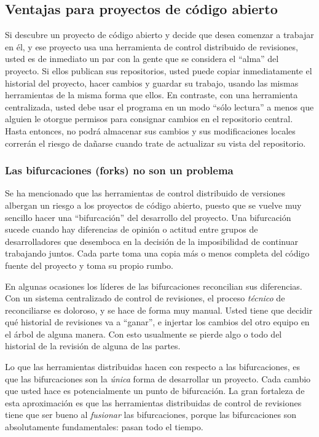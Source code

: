 \subsection{Ventajas para proyectos de código abierto}

Si descubre un proyecto de código abierto y decide que desea comenzar
a trabajar en él, y ese proyecto usa una herramienta de control
distribuido de revisiones, usted es de inmediato un par con la gente que se
considera el ``alma'' del proyecto.  Si ellos publican sus
repositorios, usted puede copiar inmediatamente el historial del proyecto,
hacer cambios y guardar su trabajo, usando las mismas herramientas de
la misma forma que ellos. En contraste, con una herramienta
centralizada, usted debe usar el programa en un modo ``sólo lectura'' a
menos que alguien le otorgue permisos para consignar cambios en el
repositorio central. Hasta entonces, no podrá almacenar sus cambios y
sus modificaciones locales correrán el riesgo de dañarse cuando trate
de actualizar su vista del repositorio.

\subsubsection{Las bifurcaciones (forks) no son un problema}

Se ha mencionado que las herramientas de control distribuido de
versiones albergan un riesgo a los proyectos de código abierto, puesto
que se vuelve muy sencillo hacer una ``bifurcación'' del
desarrollo del proyecto.  Una bifurcación sucede cuando hay diferencias
de opinión o actitud entre grupos de desarrolladores que desemboca en
la decisión de la imposibilidad de continuar trabajando juntos. Cada
parte toma una copia más o menos completa del código fuente del
proyecto y toma su propio rumbo.

En algunas ocasiones los líderes de las bifurcaciones reconcilian sus
diferencias. Con un sistema centralizado de control de revisiones, el
proceso \emph{técnico} de reconciliarse es doloroso, y se hace de
forma muy manual.  Usted tiene que decidir qué historial de revisiones va a
``ganar'', e injertar los cambios del otro equipo en el árbol de alguna
manera. Con esto usualmente se pierde algo o todo del historial de la
revisión de alguna de las partes.

Lo que las herramientas distribuidas hacen con respecto a las
bifurcaciones, es que las bifurcaciones son la \emph{única} forma de
desarrollar un proyecto. Cada cambio que usted hace es potencialmente
un punto de bifurcación. La gran fortaleza de esta aproximación es que
las herramientas distribuidas de control de revisiones tiene que ser
bueno al \emph{fusionar} las bifurcaciones, porque las bifurcaciones
son absolutamente fundamentales: pasan todo el tiempo.

